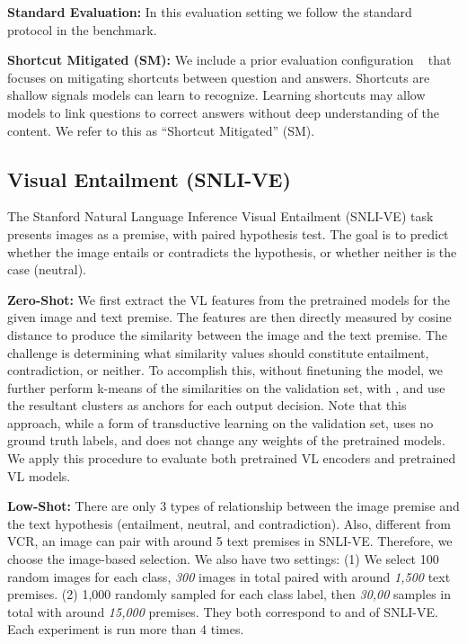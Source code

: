 \documentclass[runningheads]{llncs}
\begin{document}
{\bf \noindent Standard Evaluation:} In this evaluation setting we follow the standard protocol in the benchmark.


{\bf \noindent Shortcut Mitigated (SM):}
We include a prior evaluation configuration ~\cite{debias} that focuses on mitigating shortcuts between question and answers. Shortcuts are shallow signals models can learn to recognize. Learning shortcuts may allow models to link questions to correct answers without deep understanding of the content.  We refer to this as ``Shortcut Mitigated'' (SM).



\subsection{Visual Entailment (SNLI-VE)}



The Stanford Natural Language Inference Visual Entailment (SNLI-VE) task ~\cite{xie2019visual} presents images as a premise, with paired hypothesis test. The goal is to predict whether the image entails or contradicts the hypothesis, or whether neither is the case (neutral).


{\bf \noindent Zero-Shot:}  We first extract the VL features from the pretrained models for the given image and text premise. The features are then directly measured by cosine distance to produce the similarity between the image and the text premise. The challenge is determining what similarity values should constitute entailment, contradiction, or neither. To accomplish this, without finetuning the model, we further perform k-means of the similarities on the validation set, with , and use the resultant clusters as anchors for each output decision. Note that this approach, while a form of transductive learning on the validation set, uses no ground truth labels, and does not change any weights of the pretrained models. We apply this procedure to evaluate both pretrained VL encoders and pretrained VL models.



{\bf \noindent Low-Shot:}
There are only 3 types of relationship between the image premise and the text hypothesis (entailment, neutral, and contradiction). Also, different from VCR, an image can pair with around 5 text premises in SNLI-VE. Therefore, we choose the image-based selection. We also have two settings: (1) We select 100 random images for each class, {\em 300} images in total paired with around {\em 1,500} text premises. (2) 1,000 randomly sampled for each class label, then {\em 30,00} samples in total with around {\em 15,000} premises. They both correspond to  and  of SNLI-VE. Each experiment is run more than 4 times.
\end{document}
